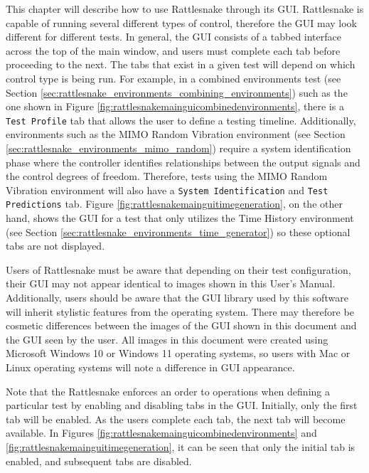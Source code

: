 \documentclass[pdf,12pt,report]{SANDreport}
\newcommand{\inlineCode}{\lstinline[basicstyle=\bfseries\ttfamily]}
\begin{document}
    This chapter will describe how to use Rattlesnake through its \ac{GUI}.  Rattlesnake is capable of running several different types of control, therefore the \ac{GUI} may look different for different tests.  In general, the \ac{GUI} consists of a tabbed interface across the top of the main window, and users must complete each tab before proceeding to the next.  The tabs that exist in a given test will depend on which control type is being run.  For example, in a combined environments test (see Section \ref{sec:rattlesnake_environments_combining_environments}) such as the one shown in Figure \ref{fig:rattlesnakemainguicombinedenvironments}, there is a \inlineCode{Test Profile} tab that allows the user to define a testing timeline.  Additionally, environments such as the \Ac{MIMO} Random Vibration environment (see Section \ref{sec:rattlesnake_environments_mimo_random}) require a system identification phase where the controller identifies relationships between the output signals and the control degrees of freedom.  Therefore, tests using the \Ac{MIMO} Random Vibration environment will also have a \inlineCode{System Identification} and \inlineCode{Test Predictions} tab.  Figure \ref{fig:rattlesnakemainguitimegeneration}, on the other hand, shows the \ac{GUI} for a test that only utilizes the Time History environment (see Section \ref{sec:rattlesnake_environments_time_generator}) so these optional tabs are not displayed.
    
    Users of Rattlesnake must be aware that depending on their test configuration, their \ac{GUI} may not appear identical to images shown in this User's Manual.  Additionally, users should be aware that the \ac{GUI} library used by this software will inherit stylistic features from the operating system.  There may therefore be cosmetic differences between the images of the \ac{GUI} shown in this document and the \ac{GUI} seen by the user.  All images in this document were created using Microsoft Windows 10 or Windows 11 operating systems, so users with Mac or Linux operating systems will note a difference in \ac{GUI} appearance.
    
    Note that the Rattlesnake enforces an order to operations when defining a particular test by enabling and disabling tabs in the \ac{GUI}.  Initially, only the first tab will be enabled.  As the users complete each tab, the next tab will become available.  In Figures \ref{fig:rattlesnakemainguicombinedenvironments} and \ref{fig:rattlesnakemainguitimegeneration}, it can be seen that only the initial tab is enabled, and subsequent tabs are disabled.
    
\end{document}
